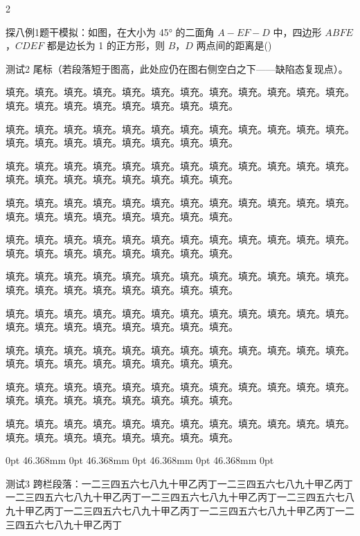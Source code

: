 \documentclass{ctexart}
\newcommand{\probeimg}[2]{%
  \textcolor{red!60}{\rule{#1mm}{#2mm}}}
\begin{document}
\begin{multicols}{2}
{探八例1题干模拟：如图，在大小为 45° 的二面角 \(A-EF-D\) 中，四边形 \(ABFE\)，\(CDEF\) 都是边长为 1 的正方形，则 \(B\)，\(D\) 两点间的距离是\nobreak\mbox{}\nobreak\hfill(\hspace{4mm})\hspace{0.56mm}\par}
\noindent 测试2 尾标（若段落短于图高，此处应仍在图右侧空白之下——缺陷态复现点）。\par
\noindent 填充。填充。填充。填充。填充。填充。填充。填充。填充。填充。填充。填充。填充。填充。填充。填充。填充。填充。填充。填充。\par
\noindent 填充。填充。填充。填充。填充。填充。填充。填充。填充。填充。填充。填充。填充。填充。填充。填充。填充。填充。填充。填充。\par
\noindent 填充。填充。填充。填充。填充。填充。填充。填充。填充。填充。填充。填充。填充。填充。填充。填充。填充。填充。填充。填充。\par
\noindent 填充。填充。填充。填充。填充。填充。填充。填充。填充。填充。填充。填充。填充。填充。填充。填充。填充。填充。填充。填充。\par
\noindent 填充。填充。填充。填充。填充。填充。填充。填充。填充。填充。填充。填充。填充。填充。填充。填充。填充。填充。填充。填充。\par
\noindent 填充。填充。填充。填充。填充。填充。填充。填充。填充。填充。填充。填充。填充。填充。填充。填充。填充。填充。填充。填充。\par
\noindent 填充。填充。填充。填充。填充。填充。填充。填充。填充。填充。填充。填充。填充。填充。填充。填充。填充。填充。填充。填充。\par
\noindent 填充。填充。填充。填充。填充。填充。填充。填充。填充。填充。填充。填充。填充。填充。填充。填充。填充。填充。填充。填充。\par
\noindent 填充。填充。填充。填充。填充。填充。填充。填充。填充。填充。填充。填充。填充。填充。填充。填充。填充。填充。填充。填充。\par
\noindent 填充。填充。填充。填充。填充。填充。填充。填充。填充。填充。填充。填充。填充。填充。填充。填充。填充。填充。填充。填充。\par
{ 0pt 46.368mm 0pt 46.368mm 0pt 46.368mm 0pt 46.368mm 0pt \linewidth
\raggedright
\noindent\smash{\rlap{\hspace{50.2mm}\raisebox{\dimexpr-\height+3.677mm\relax}[\dimexpr3.677mm\relax][\dimexpr\height-3.677mm\relax]{\probeimg{30}{22.5}}}}%
测试3 跨栏段落：一二三四五六七八九十甲乙丙丁一二三四五六七八九十甲乙丙丁一二三四五六七八九十甲乙丙丁一二三四五六七八九十甲乙丙丁一二三四五六七八九十甲乙丙丁一二三四五六七八九十甲乙丙丁一二三四五六七八九十甲乙丙丁一二三四五六七八九十甲乙丙丁\par}
\end{multicols}
\end{document}
